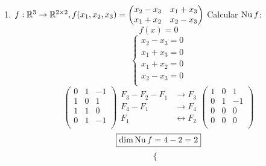\documentclass[../practica.root.tex]{subfiles}
\begin{document}
\begin{enumerate}
\begin{enumerate}
              \item \( f : \mathbb{R}^3 \to \mathbb{R}^{2\times2}, f(x_1, x_2, x_3) =
                    \begin{pmatrix}
                        x_2 - x_3 & x_1 + x_3 \\
                        x_1 + x_2 & x_2 - x_3
                    \end{pmatrix} \)
                    Calcular \(\operatorname{Nu} f\):
                    \[ f(x) = 0 \]
                    \[
                        \begin{cases}
                            x_2 - x_3 = 0 \\
                            x_1 + x_3 = 0 \\
                            x_1 + x_2 = 0 \\
                            x_2 - x_3 = 0 \\
                        \end{cases}
                    \] \[
                        \begin{pmatrix}
                            0 & 1 & -1 \\
                            1 & 0 & 1  \\
                            1 & 1 & 0  \\
                            0 & 1 & -1 \\
                        \end{pmatrix}
                        \begin{array}{rl}
                            F_3 - F_2 - F_1 & \to F_3             \\
                            F_4 - F_1       & \to F_4             \\
                            F_1             & \leftrightarrow F_2
                        \end{array}
                        \begin{pmatrix}
                            1 & 0 & 1  \\
                            0 & 1 & -1 \\
                            0 & 0 & 0  \\
                            0 & 0 & 0  \\
                        \end{pmatrix}
                    \] \[
                        \boxed{\dim\operatorname{Nu} f = 4 - 2 = 2}
                    \] \[
                        \begin{cases}

\end{cases}\]
\end{enumerate}
\end{enumerate}
\end{document}
